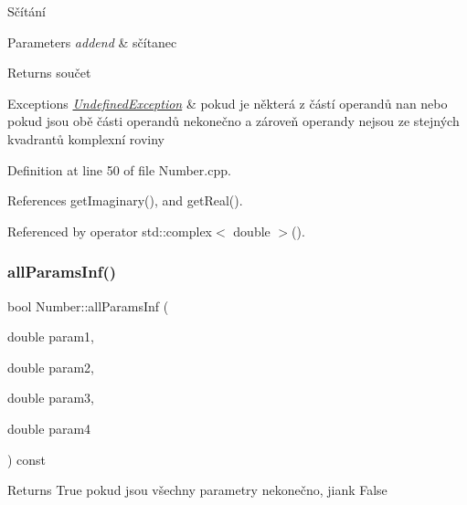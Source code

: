 Sčítání 


\begin{DoxyParams}{Parameters}
{\em addend} & sčítanec \\
\hline
\end{DoxyParams}
\begin{DoxyReturn}{Returns}
součet 
\end{DoxyReturn}

\begin{DoxyExceptions}{Exceptions}
{\em \hyperlink{classteam22_1_1_math_1_1_undefined_exception}{Undefined\+Exception}} & pokud je některá z částí operandů nan nebo pokud jsou obě části operandů nekonečno a zároveň operandy nejsou ze stejných kvadrantů komplexní roviny \\
\hline
\end{DoxyExceptions}


Definition at line 50 of file Number.\+cpp.



References get\+Imaginary(), and get\+Real().



Referenced by operator std\+::complex$<$ double $>$().

\mbox{\label{classteam22_1_1_math_1_1_number_a55293adfd56de1cac35d12878062e107}} 
\subsubsection{\texorpdfstring{all\+Params\+Inf()}{allParamsInf()}}
{\footnotesize\ttfamily bool Number\+::all\+Params\+Inf (\begin{DoxyParamCaption}\item[{double}]{param1,  }\item[{double}]{param2,  }\item[{double}]{param3,  }\item[{double}]{param4 }\end{DoxyParamCaption}) const\hspace{0.3cm}{\ttfamily [private]}}

\begin{DoxyReturn}{Returns}
True pokud jsou všechny parametry nekonečno, jiank False 
\end{DoxyReturn}


